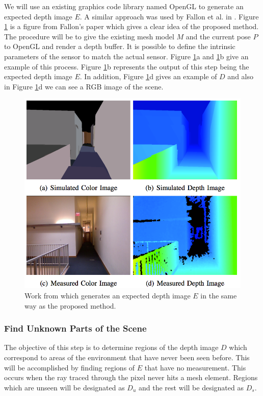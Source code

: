 \documentclass[12pt]{article}
\begin{document}
We will use an existing graphics code library named OpenGL to generate an
expected depth image $E$.  A similar approach was used by Fallon et al. in
\cite{Fallon2012}.  Figure \ref{fig:proj} is a figure from Fallon's paper
which gives a clear idea of the proposed method. The procedure will be to
give the existing mesh model $M$ and the current pose $P$ to OpenGL and
render a depth buffer. It is possible to define the intrinsic parameters of
the sensor to match the actual sensor. Figure \ref{fig:proj}a and
\ref{fig:proj}b give an example of this process.  Figure \ref{fig:proj}b
represents the output of this step being the expected depth image $E$. In
addition, Figure \ref{fig:proj}d gives an example of $D$ and also in Figure
\ref{fig:proj}d we can see a RGB image of the scene.    

\begin{figure}[h]
  \centering
    \includegraphics[height=0.6\textwidth]{m_proj.png}
  \caption{Work from \cite{Fallon2012} which generates an expected depth image $E$
in the same way as the proposed method.}
  \label{fig:proj}
\end{figure}

\subsubsection{Find Unknown Parts of the Scene}

The objective of this step is to determine regions of the depth image
$D$ which correspond to areas of the environment that have never been
seen before. This will be accomplished by finding regions of $E$ that
have no measurement. This occurs when the ray traced through the pixel
never hits a mesh element. Regions which are unseen will be designated
as $D_u$ and the rest will be designated as $D_s$. 
\end{document}
